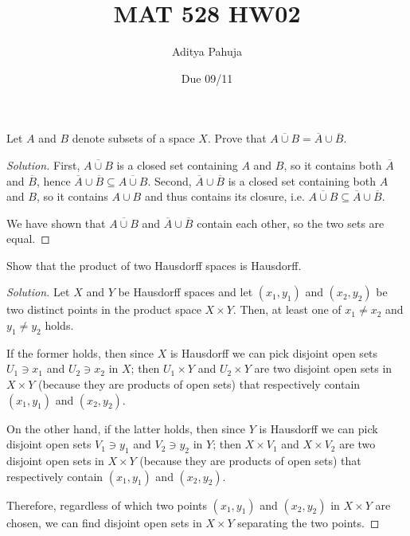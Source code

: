 \documentclass[10pt]{article}
\title{MAT 528 HW02}
\author{\large Aditya Pahuja}
\date{\large Due 09/11}
\providecommand{\ol}{\overline}
\newenvironment{soln}{\begin{proof}[Solution]}{\end{proof}}
\begin{document}
\maketitle

\begin{problem}
    [Munkres 17.6b]
    Let $A$ and $B$ denote subsets of a space $X$.
    Prove that $\ol{A\cup B} = \ol A\cup \ol B$.
\end{problem}

\begin{soln}
    First, $\ol{A\cup B}$ is a closed set containing $A$ and $B$,
    so it contains both $\ol A$ and $\ol B$,
    hence $\ol A\cup\ol B\subseteq\ol{A\cup B}$.
    Second, $\ol{A}\cup\ol B$ is a closed set containing
    both $A$ and $B$, so it contains $A\cup B$ and thus contains its closure,
    i.e. $\ol{A\cup B}\subseteq\ol A\cup\ol B$.

    We have shown that $\ol{A\cup B}$ and $\ol A\cup\ol B$ contain each other,
    so the two sets are equal.
\end{soln}

\begin{problem}
    [Munkres 17.11]
    Show that the product of two Hausdorff spaces is Hausdorff.
\end{problem}

\begin{soln}
    Let $X$ and $Y$ be Hausdorff spaces and let
    $(x_1,y_1)$ and $(x_2,y_2)$ be two distinct points
    in the product space $X\times Y$.
    Then, at least one of $x_1\ne x_2$ and $y_1\ne y_2$ holds.

    If the former holds, then since $X$ is Hausdorff
    we can pick disjoint open sets
    $U_1\ni x_1$ and $U_2\ni x_2$ in $X$;
    then $U_1\times Y$ and $U_2\times Y$ are two
    disjoint open sets in $X\times Y$ (because they are products of open sets)
    that respectively contain $(x_1,y_1)$ and $(x_2,y_2)$.

    On the other hand, if the latter holds, then since $Y$ is Hausdorff
    we can pick disjoint open sets
    $V_1\ni y_1$ and $V_2\ni y_2$ in $Y$;
    then $X\times V_1$ and $X\times V_2$ are two
    disjoint open sets in $X\times Y$ (because they are products of open sets)
    that respectively contain $(x_1,y_1)$ and $(x_2,y_2)$.

    Therefore, regardless of which two points $(x_1,y_1)$ and $(x_2,y_2)$
    in $X\times Y$ are chosen, we can find disjoint open sets in $X\times Y$
    separating the two points.
\end{soln}
\end{document}
